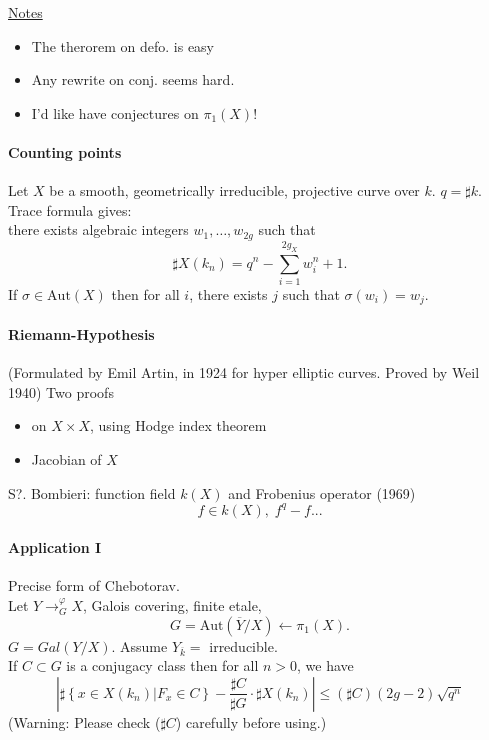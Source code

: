 \noindent
\underline{Notes } \begin{itemize}
	\item The therorem on defo. is easy
	\item Any rewrite on conj. seems hard.
	\item I'd like have conjectures on $\pi_1(X)$!
\end{itemize}


\paragraph{Counting points} Let $X$ be a smooth, geometrically irreducible, projective curve over $k$. $q=\sharp k$. Trace formula gives:\\
there exists algebraic integers $w_1, \ldots, w_{2g}$ such that 
	$$\sharp X(k_n) = q^n-\sum_{i=1}^{2g_X}w_i^n+1.$$
If $\sigma\in \text{Aut}(X)$ then for all $i$, there exists $j$ such that $\sigma(w_i)=w_j$. 

\paragraph{Riemann-Hypothesis} (Formulated by Emil Artin, in 1924 for hyper elliptic curves. Proved by Weil 1940) Two proofs
	\begin{itemize}
	\item on $X\times X$, using Hodge index theorem
	\item Jacobian of $X$
	\end{itemize}
S?. Bombieri: function field $k(X)$ and Frobenius operator (1969)
	$$f\in k(X), \; f^q-f...$$

\paragraph{Application I} Precise form of Chebotorav.\\
Let $Y\to^\varphi_G X$, Galois covering, finite etale, 
	$$G = \text{Aut}(\overline Y/X) \leftarrow \pi_1(X).$$
	$G=Gal(Y/X)$. 
	Assume $Y_{\overline k} = $ irreducible. \\
If $C\subset G$ is a conjugacy class then for all $n>0$, we have
	$$\left|\sharp\left\{x\in X(k_n)\left|F_x\in C\right.\right\}-\frac{\sharp C}{\sharp G}\cdot\sharp X(k_n)\right|\leq (\sharp C)(2g-2)\sqrt{q^n}$$
	(Warning: Please check ($\sharp C$) carefully before using.)\\
	
